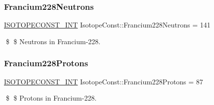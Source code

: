 \subsubsection{\texorpdfstring{Francium228\+Neutrons}{Francium228Neutrons}}
{\footnotesize\ttfamily \mbox{\hyperlink{group___isotope_const-_macros_ga5f18360b3e99483a35c32d789e62621c}{I\+S\+O\+T\+O\+P\+E\+C\+O\+N\+S\+T\+\_\+\+I\+NT}} Isotope\+Const\+::\+Francium228\+Neutrons = 141}

\$ \$ Neutrons in Francium-\/228. \mbox{\label{group___isotope_const-_francium-_fr228_gaa3f854fbf0303e0e63800bcf5dcf2803}} 
\subsubsection{\texorpdfstring{Francium228\+Protons}{Francium228Protons}}
{\footnotesize\ttfamily \mbox{\hyperlink{group___isotope_const-_macros_ga5f18360b3e99483a35c32d789e62621c}{I\+S\+O\+T\+O\+P\+E\+C\+O\+N\+S\+T\+\_\+\+I\+NT}} Isotope\+Const\+::\+Francium228\+Protons = 87}

\$ \$ Protons in Francium-\/228. 
